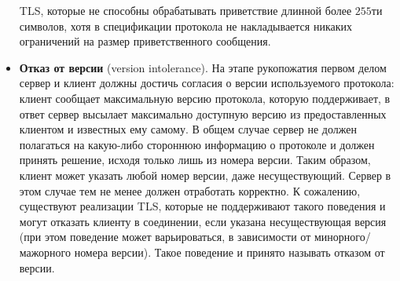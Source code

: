 \begin{itemize}
        TLS, которые не способны обрабатывать приветствие длинной более $255$ти символов, хотя в спецификации протокола не 
        накладывается никаких ограничений на размер приветственного сообщения.  
    \item \textbf{Отказ от версии} (version intolerance). На этапе рукопожатия первом делом сервер и клиент должны достичь согласия 
        о версии используемого протокола: клиент сообщает максимальную версию протокола, которую поддерживает, в ответ сервер 
        высылает максимально доступную версию из предоставленных клиентом и известных ему самому. В общем случае сервер не должен
        полагаться на какую-либо стороннюю информацию о протоколе и должен принять решение, исходя только лишь из номера версии. 
        Таким образом, клиент может указать любой номер версии, даже несуществующий. Сервер в этом случае тем не менее должен 
        отработать корректно. К сожалению, существуют реализации TLS, которые не поддерживают такого поведения и могут отказать
        клиенту в соединении, если указана несуществующая версия (при этом поведение может варьироваться, в зависимости от 
        минорного/мажорного номера версии). Такое поведение и принято называть отказом от версии.
\end{itemize}
